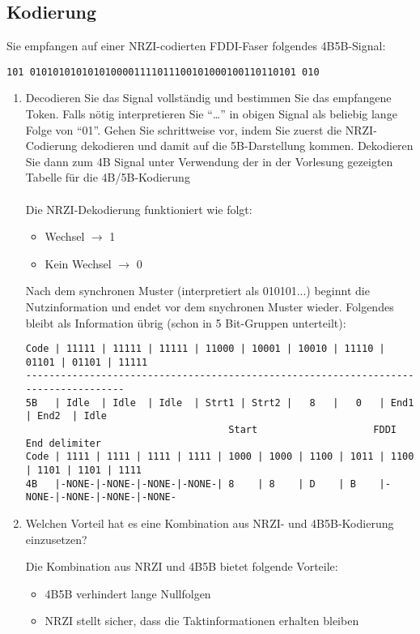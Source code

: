 \documentclass[a4paper]{article}
\begin{document}
\setcounter{section}{5}

\subsection{Kodierung}
Sie empfangen auf einer NRZI-codierten FDDI-Faser folgendes 4B5B-Signal:
\begin{verbatim}
101 0101010101010100001111011100101000100110110101 010
\end{verbatim}
\begin{enumerate}[label=\alph*)]
\item Decodieren Sie das Signal vollständig und bestimmen Sie das empfangene Token. Falls nötig interpretieren Sie “…” in obigen Signal als beliebig lange Folge von “01”. Gehen Sie schrittweise vor, indem Sie zuerst die NRZI-Codierung dekodieren und damit auf die 5B-Darstellung kommen. Dekodieren Sie dann zum 4B Signal unter Verwendung der in der Vorlesung gezeigten Tabelle für die 4B/5B-Kodierung\\\\
Die NRZI-Dekodierung funktioniert wie folgt:
\begin{itemize}
  \item Wechsel $\rightarrow$ 1
  \item Kein Wechsel $\rightarrow$ 0
\end{itemize}

Nach dem synchronen Muster (interpretiert als 010101...) beginnt die Nutzinformation und endet vor dem snychronen Muster wieder. Folgendes bleibt als Information übrig (schon in 5 Bit-Gruppen unterteilt):
\begin{verbatim}
Code | 11111 | 11111 | 11111 | 11000 | 10001 | 10010 | 11110 | 01101 | 01101 | 11111
------------------------------------------------------------------------------------
5B   | Idle  | Idle  | Idle  | Strt1 | Strt2 |   8   |   0   | End1  | End2  | Idle
                                   Start                    FDDI End delimiter
Code | 1111 | 1111 | 1111 | 1111 | 1000 | 1000 | 1100 | 1011 | 1100 | 1101 | 1101 | 1111
4B   |-NONE-|-NONE-|-NONE-|-NONE-| 8    | 8    | D    | B    |-NONE-|-NONE-|-NONE-|-NONE-
\end{verbatim}

\item Welchen Vorteil hat es eine Kombination aus NRZI- und 4B5B-Kodierung einzusetzen?

Die Kombination aus NRZI und 4B5B bietet folgende Vorteile:
\begin{itemize}
  \item 4B5B verhindert lange Nullfolgen
  \item NRZI stellt sicher, dass die Taktinformationen erhalten bleiben
\end{itemize}
\end{enumerate}
\clearpage
\end{document}
